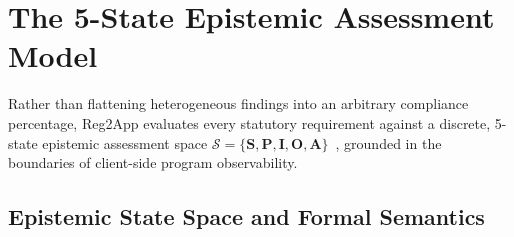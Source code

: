\section{The 5-State Epistemic Assessment Model}
\label{sec:assessment}

Rather than flattening heterogeneous findings into an arbitrary compliance percentage, Reg2App evaluates every statutory requirement against a discrete, 5-state epistemic assessment space $\mathcal{S} = \{\mathbf{S}, \mathbf{P}, \mathbf{I}, \mathbf{O}, \mathbf{A}\}$~\cite{fagin_epistemic_logic, belnap_four_valued}, grounded in the boundaries of client-side program observability.

\subsection{Epistemic State Space and Formal Semantics}
\label{sec:assessment:states}

